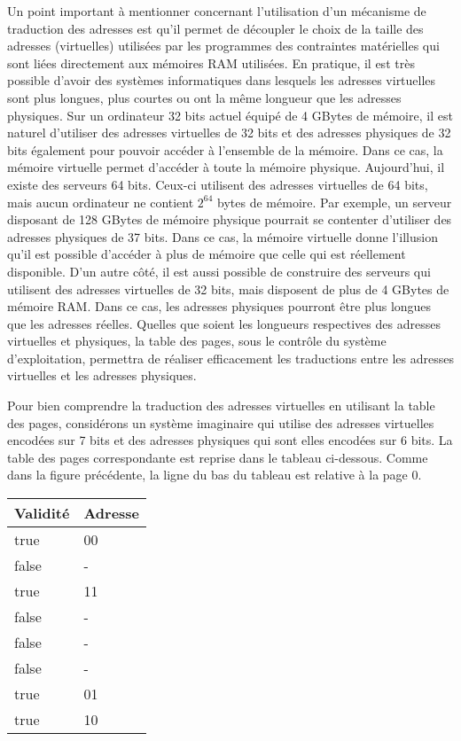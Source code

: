 Un point important à mentionner concernant l'utilisation d'un
mécanisme de traduction des adresses est qu'il permet de  découpler le
choix de la taille des adresses (virtuelles) utilisées par les
programmes des contraintes matérielles qui sont liées directement aux
mémoires RAM utilisées. En pratique, il est très possible d'avoir des
systèmes informatiques dans lesquels les adresses virtuelles sont plus
longues, plus courtes ou ont la même longueur que les adresses
physiques. Sur un ordinateur 32 bits actuel équipé de 4 GBytes de
mémoire, il est naturel d'utiliser des adresses virtuelles de 32 bits
et des adresses physiques de 32 bits également pour pouvoir accéder à
l'ensemble de la mémoire. Dans ce cas, la mémoire virtuelle permet
d'accéder à toute la mémoire physique. Aujourd'hui, il existe des
serveurs 64 bits. Ceux-ci utilisent des adresses virtuelles de 64
bits, mais aucun ordinateur ne contient $2^{64}$ bytes de
mémoire. Par exemple, un serveur disposant de 128 GBytes de mémoire
physique pourrait se contenter d'utiliser des adresses physiques de 37
bits. Dans ce cas, la mémoire virtuelle donne l'illusion qu'il est
possible d'accéder à plus de mémoire que celle qui est réellement
disponible. D'un autre côté, il est aussi possible de construire des
serveurs qui utilisent des adresses virtuelles de 32 bits, mais
disposent de plus de 4 GBytes de mémoire RAM. Dans ce cas, les
adresses physiques pourront être plus longues que les adresses
réelles. Quelles que soient les longueurs respectives des adresses
virtuelles et physiques, la table des pages, sous le contrôle du
système d'exploitation, permettra de réaliser efficacement les
traductions entre les adresses virtuelles et les adresses physiques.
\newline
  
Pour bien comprendre la traduction des adresses virtuelles en
utilisant la table des pages, considérons un système imaginaire qui
utilise des adresses virtuelles encodées sur 7 bits et des adresses
physiques qui sont elles encodées sur 6 bits. La table des pages
correspondante est reprise dans le tableau ci-dessous. Comme dans la
figure précédente, la ligne du bas du tableau est relative à la page
$0$.

\bigskip
\begin{tabular}{|l|l|}
    \hline
    Validité & Adresse \\
    \hline
    true & 00 \\
    false & - \\
    true & 11 \\
    false & - \\
    false & - \\
    false & - \\
    true & 01 \\
    true & 10 \\
    \hline
\end{tabular}
\bigskip

